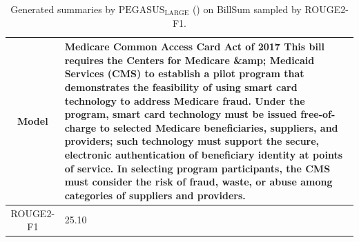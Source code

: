 \begin{table}[bth!]
\begin{tabular}{c|p{}}
\\ \hline
Model & 
Medicare Common Access Card Act of 2017 This bill requires the Centers for Medicare \&amp; Medicaid Services (CMS) to establish a pilot program that demonstrates the feasibility of using smart card technology to address Medicare fraud. Under the program, smart card technology must be issued free-of-charge to selected Medicare beneficiaries, suppliers, and providers; such technology must support the secure, electronic authentication of beneficiary identity at points of service. In selecting program participants, the CMS must consider the risk of fraud, waste, or abuse among categories of suppliers and providers.
\\ \hline
ROUGE2-F1 & 
25.10
\\ \hline
\end{tabular}
\caption{Generated summaries by $\text{PEGASUS}_{\text{LARGE}}$ (\gnews) on BillSum sampled by ROUGE2-F1.}
\end{table}

